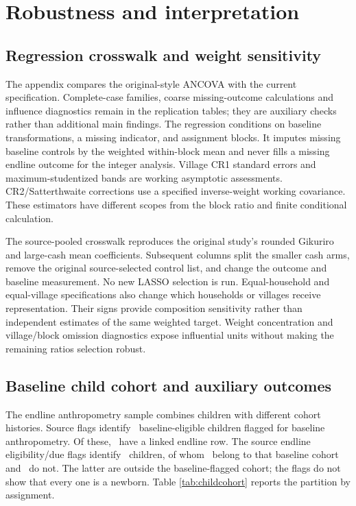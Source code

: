 \documentclass[11pt]{article}
\begin{document}
\section{Robustness and interpretation}

\subsection{Regression crosswalk and weight sensitivity}

The appendix compares the original-style ANCOVA with the current specification. Complete-case families, coarse missing-outcome calculations and influence diagnostics remain in the replication tables; they are auxiliary checks rather than additional main findings. The regression conditions on baseline transformations, a missing indicator, and assignment blocks. It imputes missing baseline controls by the weighted within-block mean and never fills a missing endline outcome for the integer analysis. Village CR1 standard errors and maximum-studentized bands are working asymptotic assessments. CR2/Satterthwaite corrections use a specified inverse-weight working covariance. These estimators have different scopes from the block ratio and finite conditional calculation.

The source-pooled crosswalk reproduces the original study's rounded Gikuriro and large-cash mean coefficients. Subsequent columns split the smaller cash arms, remove the original source-selected control list, and change the outcome and baseline measurement. No new LASSO selection is run. Equal-household and equal-village specifications also change which households or villages receive representation. Their signs provide composition sensitivity rather than independent estimates of the same weighted target. Weight concentration and village/block omission diagnostics expose influential units without making the remaining ratios selection robust.

\subsection{Baseline child cohort and auxiliary outcomes}

The endline anthropometry sample combines children with different cohort histories. Source flags identify \BaselineChildCohort\ baseline-eligible children flagged for baseline anthropometry. Of these, \LinkedChildCohort\ have a linked endline row. The source endline eligibility/due flags identify \EndlineChildDue\ children, of whom \DueLinkedChildCohort\ belong to that baseline cohort and \DueOutsideChildCohort\ do not. The latter are outside the baseline-flagged cohort; the flags do not show that every one is a newborn. Table \ref{tab:childcohort} reports the partition by assignment.
\end{document}
